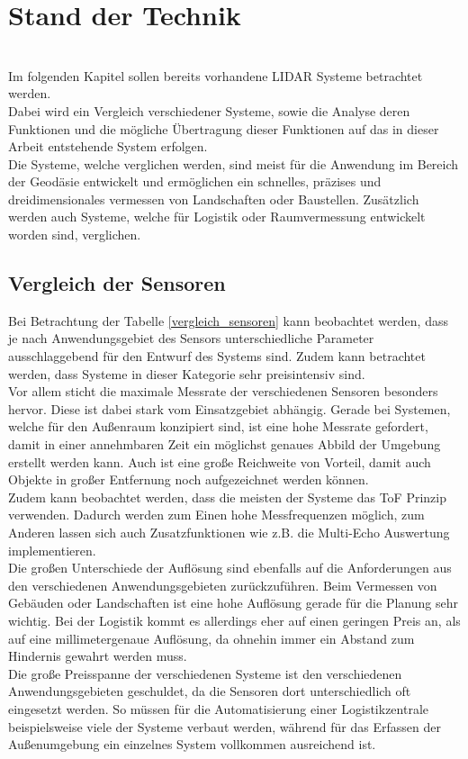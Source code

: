 \chapter{Stand der Technik}\label{chap:stand_der_technik}
\\
Im folgenden Kapitel sollen bereits vorhandene \ac{LIDAR} Systeme betrachtet werden.\\
Dabei wird ein Vergleich verschiedener Systeme, sowie die Analyse deren Funktionen und die mögliche Übertragung dieser Funktionen auf das in dieser Arbeit entstehende System erfolgen.\\
Die Systeme, welche verglichen werden, sind meist für die Anwendung im Bereich der Geodäsie entwickelt und ermöglichen ein schnelles, präzises und dreidimensionales vermessen von Landschaften oder Baustellen. Zusätzlich werden auch Systeme, welche für Logistik oder Raumvermessung entwickelt worden sind, verglichen. \\

\section{Vergleich der Sensoren}
Bei Betrachtung der Tabelle \ref{vergleich_sensoren} kann beobachtet werden, dass je nach Anwendungsgebiet des Sensors unterschiedliche Parameter ausschlaggebend für den Entwurf des Systems sind. Zudem kann betrachtet werden, dass Systeme in dieser Kategorie sehr preisintensiv sind. \\
Vor allem sticht die maximale Messrate der verschiedenen Sensoren besonders hervor. Diese ist dabei stark vom Einsatzgebiet abhängig. Gerade bei Systemen, welche für den Außenraum konzipiert sind, ist eine hohe Messrate gefordert, damit in einer annehmbaren Zeit ein möglichst genaues Abbild der Umgebung erstellt werden kann. Auch ist eine große Reichweite von Vorteil, damit auch Objekte in großer Entfernung noch aufgezeichnet werden können. \\
Zudem kann beobachtet werden, dass die meisten der Systeme das \ac{ToF} Prinzip verwenden. Dadurch werden zum Einen hohe Messfrequenzen möglich, zum Anderen lassen sich auch Zusatzfunktionen wie z.B. die Multi-Echo Auswertung implementieren. \\
Die großen Unterschiede der Auflösung sind ebenfalls auf die Anforderungen aus den verschiedenen Anwendungsgebieten zurückzuführen. Beim Vermessen von Gebäuden oder Landschaften ist eine hohe Auflösung gerade für die Planung sehr wichtig. Bei der Logistik kommt es allerdings eher auf einen geringen Preis an, als auf eine millimetergenaue Auflösung, da ohnehin immer ein Abstand zum Hindernis gewahrt werden muss.\\
Die große Preisspanne der verschiedenen Systeme ist den verschiedenen Anwendungsgebieten geschuldet, da die Sensoren dort unterschiedlich oft eingesetzt werden. So müssen für die Automatisierung einer Logistikzentrale beispielsweise viele der Systeme verbaut werden, während für das Erfassen der Außenumgebung ein einzelnes System vollkommen ausreichend ist.

